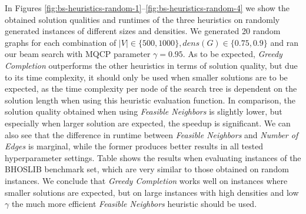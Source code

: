 \documentclass[draft,final]{vutinfth} %
\begin{document}
In Figures \ref{fig:bs-heuristics-random-1}--\ref{fig:bs-heuristics-random-4} 
we show the obtained solution qualities and runtimes of the three heuristics on randomly generated instances of different sizes and densities. We generated 20 random graphs for each combination of $|V| \in \{500, 1000\}, dens(G) \in \{0.75, 0.9\}$ and ran our beam search with MQCP parameter $\gamma=0.95$. 
As to be expected, \emph{Greedy Completion} outperforms the other heuristics in terms of solution quality, but due to its time complexity, it should only be used when smaller solutions are to be expected, as the time complexity per node of the search tree is dependent on the solution length when using this heuristic evaluation function. 
In comparison, the solution quality obtained when using \emph{Feasible Neighbors} is slightly lower, but especially when larger solution are expected, the speedup is significant.  
We can also see that the difference in runtime between \emph{Feasible Neighbors} and \emph{Number of Edges} is marginal, while the former produces better results in all tested hyperparameter settings. 
Table %
shows the results when evaluating instances of the BHOSLIB benchmark set, which are very similar to those obtained on random instances. 
We conclude that \emph{Greedy Completion} works well on instances where smaller solutions are expected, but on large instances with high densities and low $\gamma$ the much more efficient \emph{Feasible Neighbors} heuristic should be used. 
\end{document}
